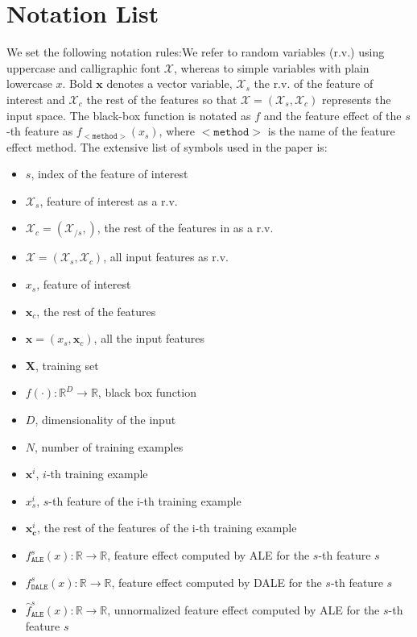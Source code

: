 \documentclass[wcp]{jmlr}
\newcommand{\xc}{\mathbf{x}_c}
\newcommand{\Xcb}{\mathcal{X}_c}
\newcommand{\Xs}{\mathcal{X}_s}
\newcommand{\Xb}{\mathcal{X}}
\newcommand{\xci}{\mathbf{x}^i_{\mathbf{c}}}
\newcommand{\xb}{\mathbf{x}}
\newcommand{\R}{\mathbb{R}}
\begin{document}
\section{Notation List}
\label{sec:not-list}
%
We set the following notation rules:We refer to random variables
(r.v.) using uppercase and calligraphic font \( \mathcal{X}\), whereas
to simple variables with plain lowercase \( x \). Bold \( \xb \)
denotes a vector variable, \( \mathcal{X}_s \) the r.v. of the feature
of interest and \( \Xcb \) the rest of the features so that
\( \Xb = (\Xs, \Xcb ) \) represents the input space. The black-box
function is notated as \( f \) and the feature effect of the \(s\)-th
feature as \(f_{\mathtt{<method>}}(x_s)\), where \(\mathtt{<method>}\)
is the name of the feature effect method. The extensive list of
symbols used in the paper is:
%
\begin{itemize}
\item \( s \), index of the feature of interest
\item \( \mathcal{X}_s \), feature of interest as a r.v.
\item \( \mathcal{X}_c = (\mathcal{X}_{/s}, )\), the rest of the features in as a r.v.
\item \( \mathcal{X} = (\mathcal{X}_s, \mathcal{X}_c)\), all input features as r.v.
\item \( x_s \), feature of interest
\item \( \xc \), the rest of the features
\item \( \xb = (x_s, \xc) \), all the input features
\item \( \mathbf{X} \), training set
\item \( f(\cdot) : \R^D \rightarrow \R \), black box function
\item \( D \), dimensionality of the input
\item \( N \), number of training examples
\item \( \xb^i \), \(i\)-th training example
\item \( x^i_s \), \(s\)-th feature of the i-th training example
\item \( \xci \), the rest of the features of the i-th training example
\item \( f_{\mathtt{ALE}}^{s}(x) : \R \rightarrow \R\), feature effect computed by ALE for the \(s\)-th feature \(s\)
\item \( f_{\mathtt{DALE}}^{s}(x) : \R \rightarrow \R\), feature effect computed by DALE for the \(s\)-th feature \(s\)
\item \( \hat{f}_{\mathtt{ALE}}^{s}(x) : \R \rightarrow \R\), unnormalized feature effect computed by ALE for the \(s\)-th feature \(s\)

\end{itemize}
\end{document}
